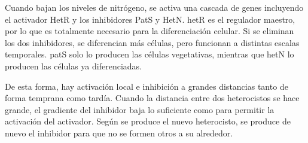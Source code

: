 \documentclass[nochap]{config/ejercicios}
\begin{document}
Cuando bajan los niveles de nitrógeno, se activa una cascada de genes incluyendo el activador HetR y los inhibidores PatS y HetN. hetR es el regulador maestro, por lo que es totalmente necesario para la diferenciación celular. Si se eliminan los dos inhibidores, se diferencian más células, pero funcionan a distintas escalas temporales. patS solo lo producen las células vegetativas, mientras que hetN lo producen las células ya diferenciadas. 

De esta forma, hay activación local e inhibición a grandes distancias tanto de forma temprana como tardía. Cuando la distancia entre dos heterocistos se hace grande, el gradiente del inhibidor baja lo suficiente como para permitir la activación del activador. Según se produce el nuevo heterocisto, se produce de nuevo el inhibidor para que no se formen otros a su alrededor. 
\end{document}
